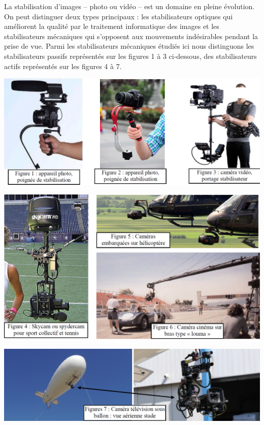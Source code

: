 \documentclass[10pt,fleqn]{article} %
\begin{document}

\vspace{5cm}
\pagestyle{fancy}
\thispagestyle{plain}

\def\columnseprulecolor{\color{white}}
\setlength{\columnseprule}{0.4pt} 



La stabilisation d’images -- photo ou vidéo -- est un domaine en pleine évolution. On peut distinguer deux types principaux : les stabilisateurs optiques qui améliorent la qualité par le traitement informatique des images et les stabilisateurs mécaniques qui s’opposent aux mouvements indésirables pendant la prise de vue. Parmi les stabilisateurs mécaniques étudiés ici nous distinguons les stabilisateurs passifs représentés sur les figures 1 à 3 ci-dessous, des stabilisateurs actifs représentés sur les figures 4 à 7. 

\begin{center}
\includegraphics[width=.8\linewidth]{images/FIG_01}
\end{center}

\begin{center}
\includegraphics[width=.8\linewidth]{images/FIG_02}
\end{center}

\begin{center}
\includegraphics[width=.8\linewidth]{images/FIG_03}
\end{center}
\end{document}
